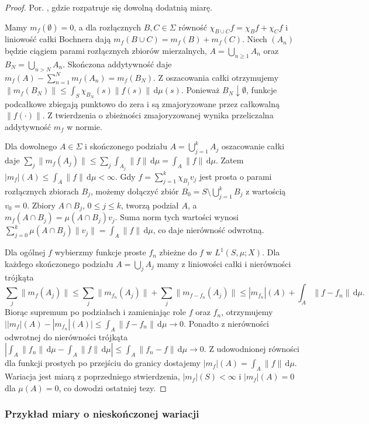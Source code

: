\begin{proof}
Por. , gdzie rozpatruje się dowolną dodatnią miarę.

Mamy $m_f(\emptyset)=0$, a dla rozłącznych $B,C\in\Sigma$
równość $\chi_{B\cup C}f=\chi_B f+\chi_C f$ i liniowość
całki Bochnera dają $m_f(B\cup C)=m_f(B)+m_f(C)$.
Niech $(A_n)$ będzie ciągiem parami rozłącznych zbiorów
mierzalnych, $A=\bigcup_{n\ge1}A_n$ oraz
$B_N=\bigcup_{n>N}A_n$. Skończona addytywność daje
$m_f(A)-\sum_{n=1}^N m_f(A_n)=m_f(B_N)$.
Z oszacowania całki otrzymujemy
$\|m_f(B_N)\|\le\int_S\chi_{B_N}(s)\|f(s)\|\,\mathrm d\mu(s)$.
Ponieważ $B_N\downarrow\emptyset$, funkcje podcałkowe
zbiegają punktowo do zera i są zmajoryzowane przez
całkowalną $\|f(\cdot)\|$. Z twierdzenia o zbieżności
zmajoryzowanej wynika przeliczalna addytywność $m_f$ w normie.

Dla dowolnego $A\in\Sigma$ i skończonego podziału
$A=\bigcup_{j=1}^k A_j$ oszacowanie całki daje
$\sum_j\|m_f(A_j)\|\le\sum_j\int_{A_j}\|f\|\,\mathrm d\mu
=\int_A\|f\|\,\mathrm d\mu$.
Zatem $|m_f|(A)\le\int_A\|f\|\,\mathrm d\mu<\infty$.
Gdy $f=\sum_{j=1}^k\chi_{B_j}v_j$ jest prosta o parami
rozłącznych zbiorach $B_j$, możemy dołączyć zbiór
$B_0=S\setminus\bigcup_{j=1}^k B_j$ z wartością $v_0=0$.
Zbiory $A\cap B_j$, $0\le j\le k$, tworzą podział $A$,
a $m_f(A\cap B_j)=\mu(A\cap B_j)v_j$.
Suma norm tych wartości wynosi
$\sum_{j=0}^k\mu(A\cap B_j)\|v_j\|
=\int_A\|f\|\,\mathrm d\mu$, co daje nierówność odwrotną.

Dla ogólnej $f$ wybierzmy funkcje proste $f_n$ zbieżne
do $f$ w $L^1(S,\mu;X)$. Dla każdego skończonego podziału
$A=\bigcup_j A_j$ mamy z liniowości całki i nierówności
trójkąta
\[
 \sum_j\|m_f(A_j)\|\le
 \sum_j\|m_{f_n}(A_j)\|+\sum_j\|m_{f-f_n}(A_j)\|
 \le |m_{f_n}|(A)+\int_A\|f-f_n\|\,\mathrm d\mu.
\]
Biorąc supremum po podziałach i zamieniając role
$f$ oraz $f_n$, otrzymujemy
$\bigl||m_f|(A)-|m_{f_n}|(A)\bigr|
\le\int_A\|f-f_n\|\,\mathrm d\mu\to0$.
Ponadto z nierówności odwrotnej do nierówności trójkąta
$|\int_A\|f_n\|\,\mathrm d\mu-\int_A\|f\|\,\mathrm d\mu|
\le\int_A\|f_n-f\|\,\mathrm d\mu\to0$.
Z udowodnionej równości dla funkcji prostych po przejściu
do granicy dostajemy $|m_f|(A)=\int_A\|f\|\,\mathrm d\mu$.
Wariacja jest miarą z poprzedniego stwierdzenia,
$|m_f|(S)<\infty$ i $|m_f|(A)=0$ dla $\mu(A)=0$,
co dowodzi ostatniej tezy.
\end{proof}

\subsubsection{Przykład miary o nieskończonej wariacji}


